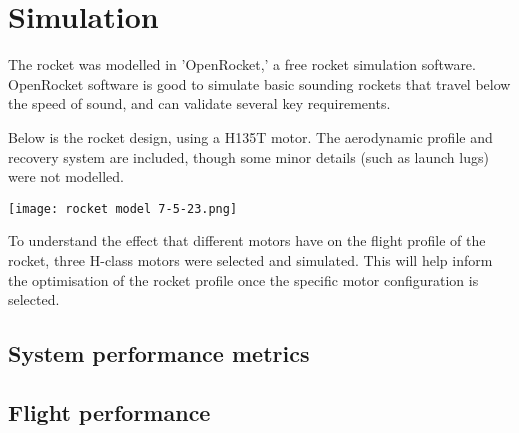 \documentclass{article}
\begin{document}
\section{Simulation}


The rocket was modelled in 'OpenRocket,' 
a free rocket simulation software. 
OpenRocket software is good to simulate basic sounding rockets that travel below the speed of sound, 
and can validate several key requirements.


Below is the rocket design, using a H135T motor. 
The aerodynamic profile and recovery system are included, 
though some minor details (such as launch lugs) were not modelled.

\texttt{[image: rocket model 7-5-23.png]}

To understand the effect that different motors have on the flight profile of the rocket, 
three H-class motors were selected and simulated. 
This will help inform the optimisation of the rocket profile once the specific motor configuration is selected.


\subsection{System performance metrics}


\subsection{Flight performance}

\end{document}
